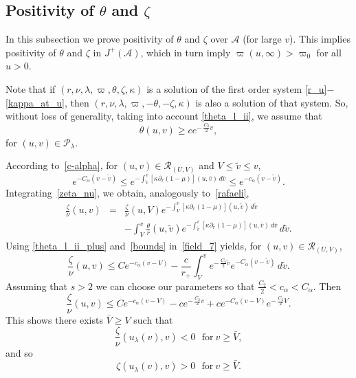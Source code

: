 \documentclass[a4paper,11pt,oneside,reqno]{amsart}
\newcommand{\s}{s}
\newcommand{\cal}{\mathcal}
\begin{document}
\subsection{Positivity of $\theta$ and $\zeta$}

In this subsection we prove positivity of $\theta$ and $\zeta$
over ${\cal A}$ (for large $v$). This implies positivity of $\theta$ and $\zeta$
in $J^+({\cal A})$, which in turn imply $\varpi(u,\infty)>\varpi_0$ for all $u>0$.

Note that if $(r,\nu,\lambda,\varpi,\theta,\zeta,\kappa)$ is a solution of the first order
system \eqref{r_u}$-$\eqref{kappa_at_u}, then 
$(r,\nu,\lambda,\varpi,-\theta,-\zeta,\kappa)$ is also a solution of that system.
So, without loss of generality, taking into account \eqref{theta_l_ii}, we assume that
\begin{equation}\label{theta_l_ii_plus}
\theta(u,v)\geq ce^{-\,\frac{C_2}{2}v},
\end{equation}
for $(u,v)\in{\cal P}_\lambda$.

According to~\eqref{c-alpha}, for $(u,v)\in{\cal R}_{(U,V)}$ and $V\leq\tilde v\leq v$,
\begin{equation}\label{bounds}
e^{-C_\alpha(v-\tilde v)}\leq
e^{-\int_{\tilde v}^{v}[\kappa\partial_r(1-\mu)](u,\bar{v})\,d\bar{v}}\leq 
e^{-c_\alpha(v-\tilde v)}.
\end{equation}
Integrating~\eqref{zeta_nu}, we obtain, analogously to~\eqref{rafaeli},
\begin{eqnarray}
\frac\zeta\nu(u,v)&=&\frac\zeta\nu(u,V)e^{-\int_{V}^{v}[\kappa\partial_r(1-\mu)](u,\tilde v)\,d\tilde v}\nonumber\\
&&-\int_{V}^{v}\frac\theta r(u,\tilde v)e^{-\int_{\tilde v}^{v}[\kappa\partial_r(1-\mu)](u,\bar{v})\,d\bar{v}}\,d\tilde v.\label{field_7}
\end{eqnarray}
Using \eqref{theta_l_ii_plus} and~\eqref{bounds} in~\eqref{field_7} yields, for $(u,v)\in{\cal R}_{(U,V)}$,
$$
\frac\zeta\nu(u,v)\leq Ce^{-c_\alpha(v-V)}-\frac{c}{r_+}\int_{V}^{v}e^{-\,\frac{C_2}{2}\tilde v}
e^{-C_\alpha(v-\tilde v)}\,d\tilde v.
$$
Assuming that $\s>2$ we can choose our parameters so that
$\frac{C_2}{2}<c_\alpha<C_\alpha$. Then
$$
\frac\zeta\nu(u,v)\leq Ce^{-c_\alpha(v-V)}-ce^{-\,\frac{C_2}{2}v}+
ce^{-C_\alpha(v-V)}e^{-\,\frac{C_2}{2}V}.
$$
This shows there exists $\bar V\geq V$ such that
$$
\frac\zeta\nu(u_\lambda(v),v)<0\ \ \ \mbox{for}\ v\geq \bar V,
$$
and so
\begin{equation}
\label{zeta_l_ii_plus}
\zeta(u_\lambda(v),v)>0\ \ \ \mbox{for}\ v\geq \bar V.
\end{equation}
\end{document}

